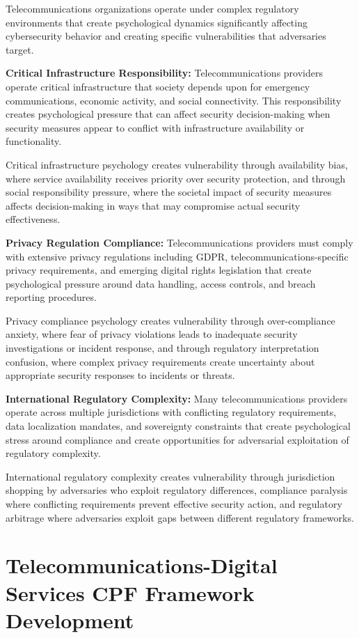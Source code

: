 \documentclass[10pt, twocolumn]{article}
\begin{document}
Telecommunications organizations operate under complex regulatory environments that create psychological dynamics significantly affecting cybersecurity behavior and creating specific vulnerabilities that adversaries target.

\textbf{Critical Infrastructure Responsibility:} Telecommunications providers operate critical infrastructure that society depends upon for emergency communications, economic activity, and social connectivity. This responsibility creates psychological pressure that can affect security decision-making when security measures appear to conflict with infrastructure availability or functionality.

Critical infrastructure psychology creates vulnerability through availability bias, where service availability receives priority over security protection, and through social responsibility pressure, where the societal impact of security measures affects decision-making in ways that may compromise actual security effectiveness.

\textbf{Privacy Regulation Compliance:} Telecommunications providers must comply with extensive privacy regulations including GDPR, telecommunications-specific privacy requirements, and emerging digital rights legislation that create psychological pressure around data handling, access controls, and breach reporting procedures.

Privacy compliance psychology creates vulnerability through over-compliance anxiety, where fear of privacy violations leads to inadequate security investigations or incident response, and through regulatory interpretation confusion, where complex privacy requirements create uncertainty about appropriate security responses to incidents or threats.

\textbf{International Regulatory Complexity:} Many telecommunications providers operate across multiple jurisdictions with conflicting regulatory requirements, data localization mandates, and sovereignty constraints that create psychological stress around compliance and create opportunities for adversarial exploitation of regulatory complexity.

International regulatory complexity creates vulnerability through jurisdiction shopping by adversaries who exploit regulatory differences, compliance paralysis where conflicting requirements prevent effective security action, and regulatory arbitrage where adversaries exploit gaps between different regulatory frameworks.

\section{Telecommunications-Digital Services CPF Framework Development}
\end{document}
